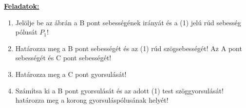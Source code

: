 \documentclass[11pt,a4paper]{article}
\begin{document}
\underline{\textbf{Feladatok:}}
\begin{enumerate}
    \item Jelölje be az ábrán a B pont sebességének irányát és a (1) jelú rúd sebesség pólusát \(P_1\)!
    \item Határozza meg a B pont sebességét és az (1) rúd szögsebességét! Az A pont sebességét és C pont sebességét!
    \item Határozza meg a C pont gyorsulását!
    \item Számítsa ki a B pont gyorsulását és az adott (1) test szöggyorsulását! határozza meg a korong gyorsuláspólusának helyét!
\end{enumerate}
\end{document}
